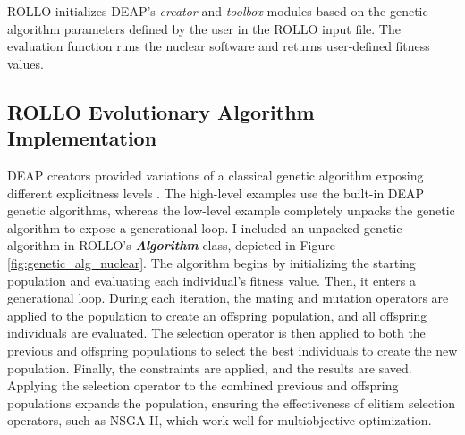 \gls{ROLLO} initializes \gls{DEAP}'s \textit{creator} and \textit{toolbox} modules 
based on the genetic algorithm parameters defined by the user in the \gls{ROLLO} 
input file. 
The evaluation function runs the nuclear software and returns user-defined 
fitness values. 

\subsection{ROLLO Evolutionary Algorithm Implementation}
\gls{DEAP} creators provided variations of a classical genetic algorithm 
exposing different explicitness levels \cite{fortin_deap_2012}. 
The high-level examples use the built-in \gls{DEAP} genetic algorithms, 
whereas the low-level example completely unpacks the genetic algorithm to expose 
a generational loop. 
I included an unpacked genetic algorithm in ROLLO's 
\textbf{\textit{Algorithm}} class, depicted in Figure \ref{fig:genetic_alg_nuclear}. 
The algorithm begins by initializing the starting population and evaluating 
each individual's fitness value. 
Then, it enters a generational loop. 
During each iteration, the mating and mutation operators are applied to the population
to create an offspring population, and all offspring individuals are evaluated. 
The selection operator is then applied to both the previous and offspring populations 
to select the best individuals to create the new population. 
Finally, the constraints are applied, and the results are saved.
Applying the selection operator to the combined previous and offspring 
populations expands the population, ensuring the effectiveness of 
elitism selection operators, such as NSGA-II, which work well 
for multiobjective optimization. 

